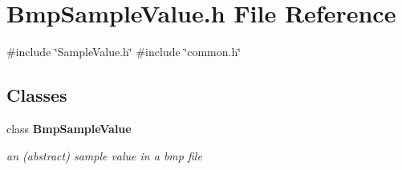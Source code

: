 \section{Bmp\+Sample\+Value.\+h File Reference}
\label{BmpSampleValue_8h}
{\ttfamily \#include \char`\"{}Sample\+Value.\+h\char`\"{}}\newline
{\ttfamily \#include \char`\"{}common.\+h\char`\"{}}\newline
\subsection*{Classes}
\begin{DoxyCompactItemize}
\item 
class \textbf{ Bmp\+Sample\+Value}
\begin{DoxyCompactList}\small\item\em an (abstract) sample value in a bmp file \end{DoxyCompactList}\end{DoxyCompactItemize}

